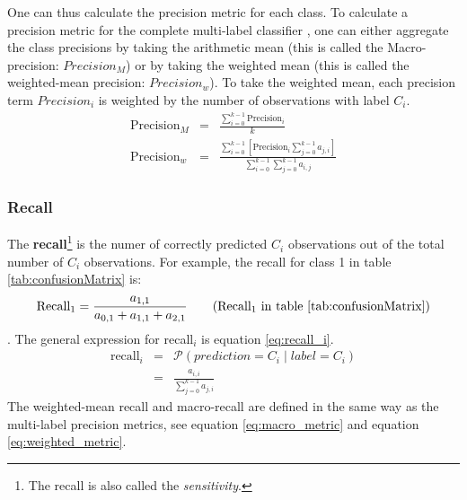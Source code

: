 \par{
    One can thus calculate the precision metric for each class. 
    To calculate a precision metric for the complete multi-label classifier
    , one can either aggregate the class precisions by taking the arithmetic mean (this is called the Macro-precision: $Precision_M$) or by taking the weighted mean (this is called the weighted-mean precision: $Precision_w$).
    To take the weighted mean, each precision term $Precision_i$ is weighted by the number of observations with label $C_i$. 
    \begin{eqnarray}
        \text{Precision}_M &=& \frac{\sum_{i=0}^{k-1} \text{Precision}_i}{k}  \label{eq:macro_metric}\\
        \text{Precision}_w &=& \frac{\sum_{i=0}^{k-1} \left[ \text{Precision}_i \sum_{j=0}^{k-1} a_{j,i} \right] }{\sum_{i=0}^{k-1} \sum_{j=0}^{k-1} a_{i,j} }  \label{eq:weighted_metric}
    \end{eqnarray}
}




\subsubsection{Recall}
\par{
    The \textbf{recall}\footnote{The recall is also called the \textit{sensitivity}.} is the numer of correctly predicted $C_i$ observations out of the total number of $C_i$ observations.
    For example, the recall for class 1 in table \ref{tab:confusionMatrix} is:
    \begin{equation}
        \text{Recall}_1 = \frac{a_{1,1}}{a_{0,1} + a_{1,1} + a_{2, 1}} \tag{Recall$_1$ in table \ref{tab:confusionMatrix}}
    \end{equation}.
    The general expression for recall$_i$ is equation \ref{eq:recall_i}.
    \begin{eqnarray}
        \text{recall}_i &=& \mathcal{P} \left( prediction = C_i \mid label = C_i \right) \\
        &=& \frac{a_{i, i}}{\sum_{j=0}^{k-1} a_{j, i}} \label{eq:recall_i}
    \end{eqnarray}
    The weighted-mean recall and macro-recall are defined in the same way as the multi-label precision metrics, see equation \ref{eq:macro_metric} and equation \ref{eq:weighted_metric}.
}




